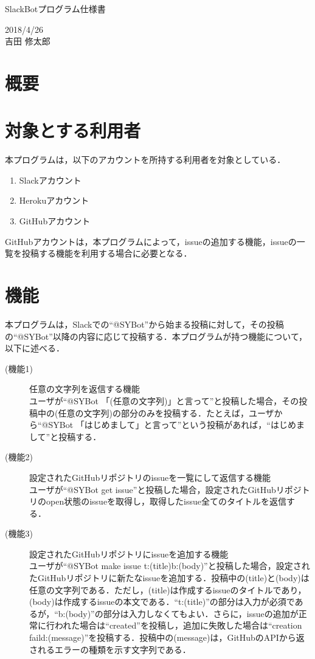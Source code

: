 \documentclass[12pt]{jsarticle}
\begin{document}
\begin{center}
{\LARGE SlackBotプログラム仕様書}
\end{center}

\begin{flushright}
  2018/4/26\\
  吉田 修太郎
\end{flushright}
\section{概要}
\label{sec:introduction}
\section{対象とする利用者}
本プログラムは，以下のアカウントを所持する利用者を対象としている．
\begin{enumerate}
\item Slackアカウント
\item Herokuアカウント
\item GitHubアカウント
\end{enumerate}
GitHubアカウントは，本プログラムによって，issueの追加する機能，issueの一覧を投稿する機能を利用する場合に必要となる．
\section{機能}
本プログラムは，Slackでの``@SYBot''から始まる投稿に対して，その投稿の``@SYBot''以降の内容に応じて投稿する．本プログラムが持つ機能について，以下に述べる．
\begin{description}
\item[(機能1)] 任意の文字列を返信する機能\\
  ユーザが``@SYBot 「(任意の文字列)」と言って''と投稿した場合，その投稿中の(任意の文字列)の部分のみを投稿する．たとえば，ユーザから``@SYBot 「はじめまして」と言って''という投稿があれば，``はじめまして''と投稿する．
\item[(機能2)] 設定されたGitHubリポジトリのissueを一覧にして返信する機能\\
  ユーザが``@SYBot get issue''と投稿した場合，設定されたGitHubリポジトリのopen状態のissueを取得し，取得したissue全てのタイトルを返信する．
\item[(機能3)] 設定されたGitHubリポジトリにissueを追加する機能\\
  ユーザが``@SYBot make issue t:(title)b:(body)''と投稿した場合，設定されたGitHubリポジトリに新たなissueを追加する．投稿中の(title)と(body)は任意の文字列である．ただし，(title)は作成するissueのタイトルであり，(body)は作成するissueの本文である．``t:(title)''の部分は入力が必須であるが，``b:(body)''の部分は入力しなくてもよい．さらに，issueの追加が正常に行われた場合は``created''を投稿し，追加に失敗した場合は``creation faild:(message)''を投稿する．投稿中の(message)は，GitHubのAPIから返されるエラーの種類を示す文字列である．
\end{description}
\end{document}

